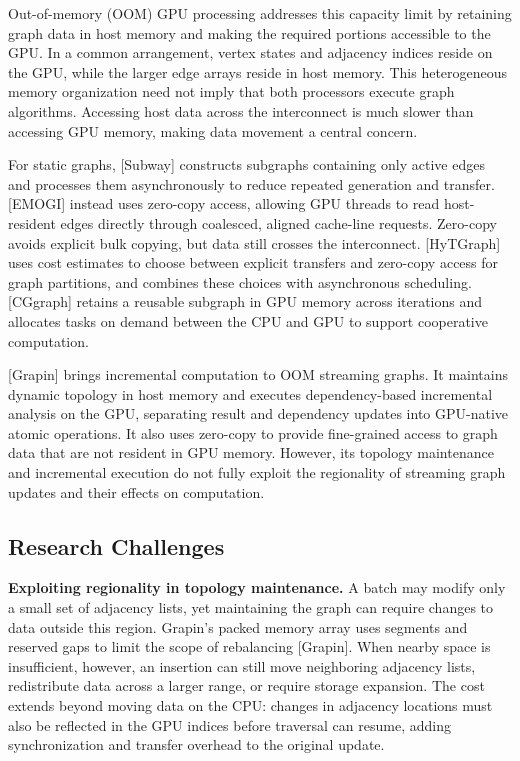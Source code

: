 Out-of-memory (OOM) GPU processing addresses this capacity limit by retaining graph data in host memory and making the required portions accessible to the GPU. In a common arrangement, vertex states and adjacency indices reside on the GPU, while the larger edge arrays reside in host memory. This heterogeneous memory organization need not imply that both processors execute graph algorithms. Accessing host data across the interconnect is much slower than accessing GPU memory, making data movement a central concern.

For static graphs, [Subway] constructs subgraphs containing only active edges and processes them asynchronously to reduce repeated generation and transfer. [EMOGI] instead uses zero-copy access, allowing GPU threads to read host-resident edges directly through coalesced, aligned cache-line requests. Zero-copy avoids explicit bulk copying, but data still crosses the interconnect. [HyTGraph] uses cost estimates to choose between explicit transfers and zero-copy access for graph partitions, and combines these choices with asynchronous scheduling. [CGgraph] retains a reusable subgraph in GPU memory across iterations and allocates tasks on demand between the CPU and GPU to support cooperative computation.

[Grapin] brings incremental computation to OOM streaming graphs. It maintains dynamic topology in host memory and executes dependency-based incremental analysis on the GPU, separating result and dependency updates into GPU-native atomic operations. It also uses zero-copy to provide fine-grained access to graph data that are not resident in GPU memory. However, its topology maintenance and incremental execution do not fully exploit the regionality of streaming graph updates and their effects on computation.

\subsection{Research Challenges}

\textbf{Exploiting regionality in topology maintenance.} A batch may modify only a small set of adjacency lists, yet maintaining the graph can require changes to data outside this region. Grapin's packed memory array uses segments and reserved gaps to limit the scope of rebalancing [Grapin]. When nearby space is insufficient, however, an insertion can still move neighboring adjacency lists, redistribute data across a larger range, or require storage expansion. The cost extends beyond moving data on the CPU: changes in adjacency locations must also be reflected in the GPU indices before traversal can resume, adding synchronization and transfer overhead to the original update.

